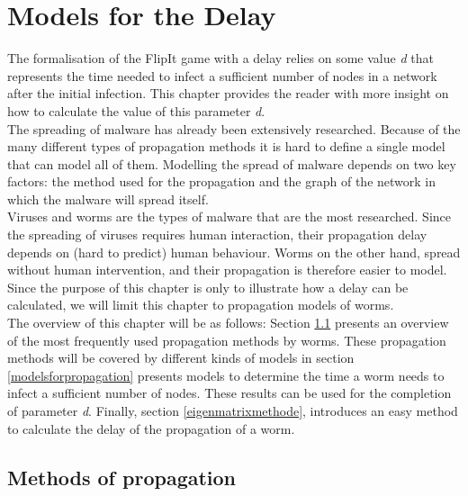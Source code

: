 \chapter{Models for the Delay}
\label{chapter4: Worm propagation}



The formalisation of the FlipIt game with a delay relies on some value  \textit{d} that represents the time needed to infect a sufficient number of nodes in a network after the initial infection. This chapter provides the reader with more insight on how to calculate the value of this parameter \textit{d}.  \\

The  spreading of malware has already been extensively researched. Because of the many different types of propagation methods it is hard to define a single model that can model all of them. Modelling the spread of malware depends on two key factors: the method used for the propagation and the graph of the network in which the malware will spread itself. \\
Viruses and worms are the types of malware that are the most researched. Since the spreading of viruses requires human interaction, their propagation delay depends on (hard to predict) human behaviour. Worms on the other hand, spread without human intervention, and their propagation is therefore easier to model. Since the purpose of this chapter is only to illustrate how a delay can be calculated, we will limit this chapter to propagation models of worms. \\

The overview of this chapter will be as follows: Section \ref{methodsofpropagation} presents an overview of the most frequently used propagation methods by worms. These propagation methods will be covered by different kinds of models in section \ref{modelsforpropagation} presents models to determine the time a worm needs to infect a sufficient number of nodes. These results can be used for the completion of parameter \textit{d}.  Finally, section \ref{eigenmatrixmethode}, introduces an easy method to calculate the delay of the propagation of a worm. %



\section{Methods of propagation}
\label{methodsofpropagation}

